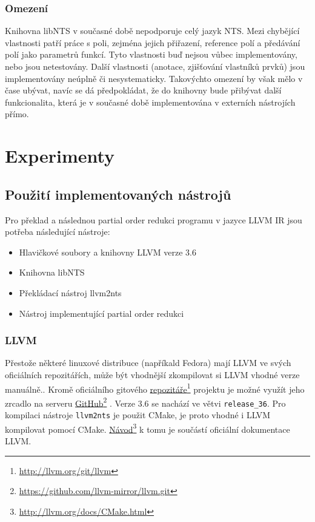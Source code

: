 \documentclass{fithesis2}
\newcommand\fnurl[2]{%
  \href{#2}{#1}\footnote{\url{#2}}%
}
\begin{document}
\subsection{Omezení}
Knihovna libNTS v současné době nepodporuje celý jazyk NTS. Mezi chybějící vlastnosti patří práce s poli, zejména jejich přiřazení, reference polí a předávání polí jako parametrů funkcí. Tyto vlastnosti buď nejsou vůbec implementovány, nebo jsou netestovány. Další vlastnosti (anotace, zjišťování vlastníků prvků) jsou implementovány neúplně či nesystematicky. Takovýchto omezení by však mělo v čase ubývat, navíc se dá předpokládat, že do knihovny bude přibývat další funkcionalita, která je v současné době implementována v externích nástrojích přímo.


\chapter{Experimenty}
\section{Použití implementovaných nástrojů}
Pro překlad a následnou partial order redukci programu v jazyce LLVM IR jsou potřeba následující nástroje:
\begin{itemize}
\item Hlavičkové soubory a knihovny LLVM verze 3.6
\item Knihovna libNTS
\item Překládací nástroj llvm2nts
\item Nástroj implementující partial order redukci
\end{itemize}

\subsection{LLVM}
Přestože některé linuxové distribuce (napříkald Fedora) mají LLVM ve svých oficiálních repozitářích, může být vhodnější zkompilovat si LLVM vhodné verze manuálně.. Kromě oficiálního gitového
\fnurl{repozitáře}{http://llvm.org/git/llvm} projektu je možné využít jeho zrcadlo na serveru
\fnurl{GitHub}{https://github.com/llvm-mirror/llvm.git}. Verze 3.6 se nachází ve větvi \texttt{release_36}. Pro kompilaci nástroje \texttt{llvm2nts} je použit CMake, je proto vhodné i LLVM kompilovat pomocí CMake. \fnurl{Návod}{http://llvm.org/docs/CMake.html} k tomu je součástí oficiální dokumentace LLVM.
\end{document}
